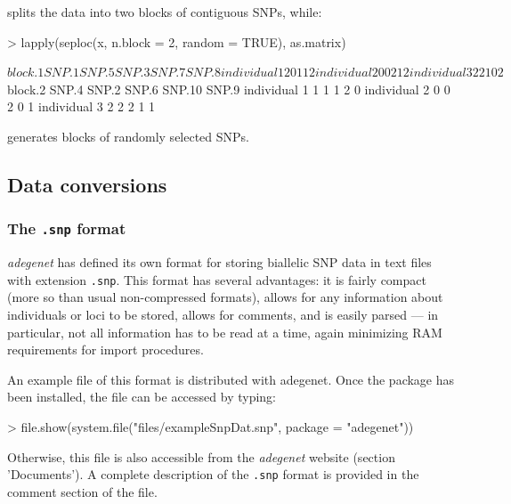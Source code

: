 \documentclass{article}
\begin{document}
splits the data into two blocks of contiguous SNPs, while:
\begin{Schunk}
\begin{Sinput}
> lapply(seploc(x, n.block = 2, random = TRUE), as.matrix)
\end{Sinput}
\begin{Soutput}
$block.1
             SNP.1 SNP.5 SNP.3 SNP.7 SNP.8
individual 1     2     0     1     1     2
individual 2     0     0     2     1     2
individual 3     2     2     1     0     2

$block.2
             SNP.4 SNP.2 SNP.6 SNP.10 SNP.9
individual 1     1     1     1      2     0
individual 2     0     0     2      0     1
individual 3     2     2     2      1     1
\end{Soutput}
\end{Schunk}
generates blocks of randomly selected SNPs.




\subsection{Data conversions}

\subsubsection{The \texttt{.snp} format}

\textit{adegenet} has defined its own format for storing biallelic SNP data in text files with
extension \texttt{.snp}.
This format has several advantages: it is fairly compact (more so than usual non-compressed
formats), allows for any information about individuals or loci to be stored, allows for comments,
and is easily parsed --- in particular, not all information has to be read at a time, again
minimizing RAM requirements for import procedures.


An example file of this format is distributed with adegenet.
Once the package has been installed, the file can be accessed by typing:
\begin{Schunk}
\begin{Sinput}
> file.show(system.file("files/exampleSnpDat.snp", package = "adegenet"))
\end{Sinput}
\end{Schunk}
Otherwise, this file is also accessible from the \textit{adegenet} website (section 'Documents').
A complete description of the \texttt{.snp} format is provided in the comment section of the file.
\\
\end{document}
